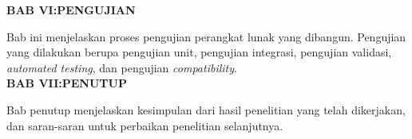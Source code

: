 \noindent
\textbf{BAB VI:\@ PENGUJIAN}

Bab ini menjelaskan proses pengujian perangkat lunak yang
dibangun. Pengujian yang dilakukan berupa pengujian unit, pengujian
integrasi, pengujian validasi, \emph{automated testing}, dan pengujian
\emph{compatibility}. \\

\noindent
\textbf{BAB VII:\@ PENUTUP}

Bab penutup menjelaskan kesimpulan dari hasil penelitian yang telah
dikerjakan, dan saran-saran untuk perbaikan penelitian selanjutnya.\\

